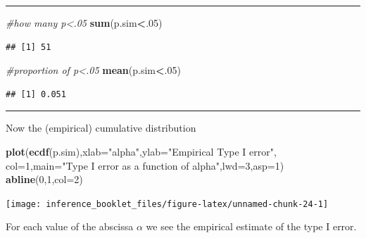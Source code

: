 \documentclass[]{article}
\newenvironment{Shaded}{\begin{snugshade}}{\end{snugshade}}
\newcommand{\CommentTok}[1]{\textcolor[rgb]{0.56,0.35,0.01}{\textit{#1}}}
\newcommand{\DataTypeTok}[1]{\textcolor[rgb]{0.13,0.29,0.53}{#1}}
\newcommand{\DecValTok}[1]{\textcolor[rgb]{0.00,0.00,0.81}{#1}}
\newcommand{\KeywordTok}[1]{\textcolor[rgb]{0.13,0.29,0.53}{\textbf{#1}}}
\newcommand{\NormalTok}[1]{#1}
\newcommand{\OperatorTok}[1]{\textcolor[rgb]{0.81,0.36,0.00}{\textbf{#1}}}
\newcommand{\StringTok}[1]{\textcolor[rgb]{0.31,0.60,0.02}{#1}}
\begin{document}
\begin{center}\rule{0.5\linewidth}{\linethickness}\end{center}

\begin{Shaded}
\begin{Highlighting}[]
\CommentTok{#how many p<.05}
\KeywordTok{sum}\NormalTok{(p.sim}\OperatorTok{<}\NormalTok{.}\DecValTok{05}\NormalTok{)}
\end{Highlighting}
\end{Shaded}

\begin{verbatim}
## [1] 51
\end{verbatim}

\begin{Shaded}
\begin{Highlighting}[]
\CommentTok{#proportion of p<.05}
\KeywordTok{mean}\NormalTok{(p.sim}\OperatorTok{<}\NormalTok{.}\DecValTok{05}\NormalTok{)}
\end{Highlighting}
\end{Shaded}

\begin{verbatim}
## [1] 0.051
\end{verbatim}

\begin{center}\rule{0.5\linewidth}{\linethickness}\end{center}

Now the (empirical) cumulative distribution

\begin{Shaded}
\begin{Highlighting}[]
\KeywordTok{plot}\NormalTok{(}\KeywordTok{ecdf}\NormalTok{(p.sim),}\DataTypeTok{xlab=}\StringTok{"alpha"}\NormalTok{,}\DataTypeTok{ylab=}\StringTok{"Empirical Type I error"}\NormalTok{, }\DataTypeTok{col=}\DecValTok{1}\NormalTok{,}\DataTypeTok{main=}\StringTok{"Type I error as a function of alpha"}\NormalTok{,}\DataTypeTok{lwd=}\DecValTok{3}\NormalTok{,}\DataTypeTok{asp=}\DecValTok{1}\NormalTok{)}
\KeywordTok{abline}\NormalTok{(}\DecValTok{0}\NormalTok{,}\DecValTok{1}\NormalTok{,}\DataTypeTok{col=}\DecValTok{2}\NormalTok{)}
\end{Highlighting}
\end{Shaded}

\begin{center}\texttt{[image: inference\_booklet\_files/figure-latex/unnamed-chunk-24-1]} \end{center}

For each value of the abscissa \(\alpha\) we see the empirical estimate
of the type I error.
\end{document}
